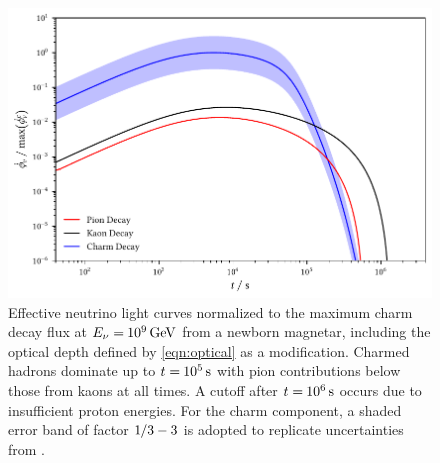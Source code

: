 \begin{figure}[H]
	\centering
	\includegraphics{../plots/build/magnetar_neutrino_spectrum_with.pdf}
	\caption[Magnetar $\nu \kern+0.5pt$ flux compared to $c$ decay with optical depth.]
			{Effective neutrino light curves normalized to the maximum charm decay flux at
			 $E_\nu = \kern-0.5pt \qty{e9}{\giga\electronvolt}$ from a newborn magnetar, including the optical depth
			 defined by \eqref{eqn:optical} as a modification. Charmed hadrons dominate up to $t = \kern-0.5pt \qty{e5}{\second}$
			 with pion contributions below those from kaons at all times. A cutoff after $t = \kern-0.5pt \qty{e6}{\second}$ occurs
			 due to insufficient proton energies. For the charm component, a shaded error band of factor $1 \kern-0.5pt /3 - 3$
			 is adopted to replicate uncertainties from \cite{Carpio_2020}.}
	\label{fig:magnetar-flux-with}
\end{figure}
